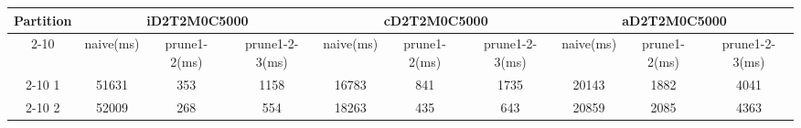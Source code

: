 \begin{table*}[t]
  \centering
\makeatletter
    \long{}
\makeatother
  \caption{2 partitions}
    \vspace*{3pt}
  \footnotesize

  \label{table:partition4}
  \begin{tabular}{|c||c|c|c|c|c|c|c|c|c|}
  \hline
  \multirow{2}{*}{Partition} &  \multicolumn{3}{|c|}{iD2T2M0C5000} & \multicolumn{3}{|c|}{cD2T2M0C5000} &\multicolumn{3}{|c|}{aD2T2M0C5000} \\\cline{2-10}
    &  naive(ms) & prune1-2(ms) & prune1-2-3(ms) & naive(ms) & prune1-2(ms) & prune1-2-3(ms) & naive(ms) & prune1-2(ms) & prune1-2-3(ms) \\\hline \hline

\cline{2-10}
    1 &  51631 & 353 & 1158 & 16783 & 841 & 1735 & 20143 & 1882 & 4041 \\\hline

\cline{2-10}
    2 &  52009 & 268 & 554 & 18263 & 435 & 643 & 20859 & 2085 & 4363 \\\hline
    
  \end{tabular}
  \vspace*{-17pt}
\end{table*}



